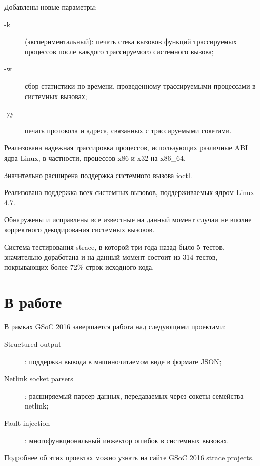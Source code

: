 \documentclass[10pt, a5paper]{article}
\begin{document}
Добавлены новые параметры:
\begin{description}
\item[-k] (экспериментальный): печать стека вызовов функций трассируемых
процессов после каждого трассируемого системного вызова;
\item[-w] сбор статистики по времени, проведенному трассируемыми процессами
в системных вызовах;
\item[-yy] печать протокола и адреса, связанных с трассируемыми сокетами.
\end{description}

Реализована надежная трассировка процессов, использующих различные ABI ядра
Linux, в частности, процессов x86 и x32 на x86\_64.

Значительно расширена поддержка системного вызова ioctl.

Реализована поддержка всех системных вызовов, поддерживаемых ядром Linux 4.7.

Обнаружены и исправлены все известные на данный момент случаи не вполне
корректного декодирования системных вызовов.

Система тестирования strace, в которой три года назад было 5 тестов,
значительно доработана и на данный момент состоит из 314 тестов, покрывающих
более 72\% строк исходного кода.

\section*{В работе}
В рамках GSoC 2016 завершается работа над следующими проектами:
\begin{description}
\item[Structured output]: поддержка вывода в машиночитаемом виде в формате
JSON;
\item [Netlink socket parsers]: расширяемый парсер данных, передаваемых через
сокеты семейства netlink;
\item [Fault injection]: многофункциональный инжектор ошибок в системных
вызовах.
\end{description}

Подробнее об этих проектах можно узнать на сайте GSoC 2016 strace
projects\cite{gsoc2016}.
\end{document}
